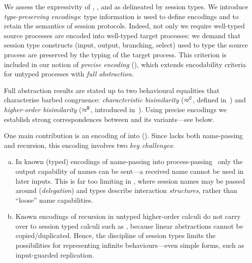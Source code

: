 \documentclass[runningheads]{llncs}
\begin{document}
We assess the expressivity  of \HOp, \HO, and \sessp as delineated by session types. 
We introduce \emph{type-preserving encodings}:
type information is used to define encodings
and to retain the semantics of session protocols. 
Indeed,  not only we require 
well-typed source processes are encoded into 
well-typed target processes: 
we demand that session type constructs (input, output, branching, select) used to type the source process
are preserved by the typing of the target process.
This criterion is included in 
our notion of \emph{precise encoding} (), which 
extends encodability criteria for untyped processes with 
\emph{full abstraction}.
{Full abstraction results are stated
up to two
behavioural equalities that characterise barbed congruence:
\emph{characteristic bisimilarity} ($\approx^\mathtt{C}$, defined in~\cite{characteristic_bis})
and 
\emph{higher-order bisimilarity} ($\approx^\mathtt{H}$, introduced in~\cite{KouzapasPY17}).
Using precise encodings we establish strong correspondences between 
\HOp and its variants---see 
below.


One main contribution is 
an encoding of \HOp into \HO ().  
Since \HO lacks 
both name-passing and recursion, this encoding involves two \emph{key challenges}:
\begin{enumerate}[a.]
\item In known (typed) 
encodings of name-passing into process-passing~\cite{SaWabook} %
only the output capability of names can be sent---a received name cannot be used in later inputs.
This is far too limiting in \HOp, where 
 session names %
 may be passed around (\emph{delegation})
and types describe interaction  \emph{structures}, rather than ``loose'' name capabilities. %



\item %
Known encodings of recursion in untyped higher-order calculi
do not carry over to session typed calculi such as \HOp,
because linear abstractions cannot be copied/duplicated. Hence, the discipline of session types  limits 
the possibilities for representing infinite behaviours---even simple forms, such as input-guarded replication.
\end{enumerate}




}
\end{document}
